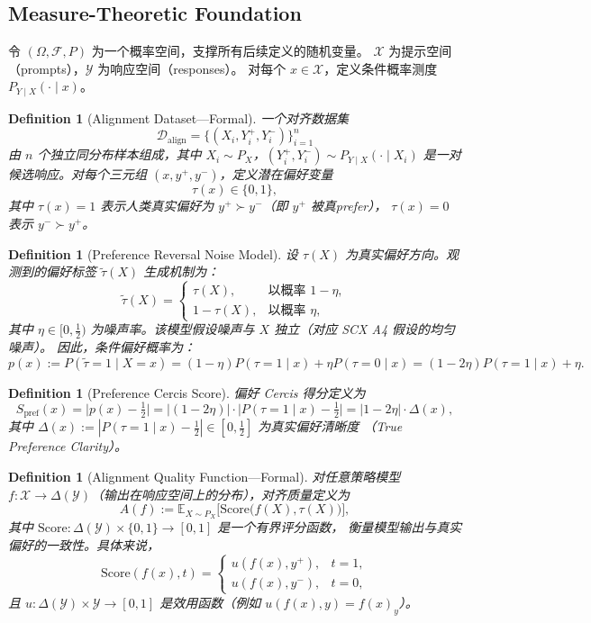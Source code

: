 \documentclass[12pt,a4paper]{article}
\newtheorem{definition}[theorem]{Definition}
\newcommand{\E}{\mathbb{E}}
\newcommand{\cX}{\mathcal{X}}
\newcommand{\cY}{\mathcal{Y}}
\newcommand{\cD}{\mathcal{D}}
\begin{document}
\subsection{Measure-Theoretic Foundation}

令 $(\Omega, \mathcal{F}, P)$ 为一个概率空间，支撑所有后续定义的随机变量。
$\cX$ 为提示空间（prompts），$\cY$ 为响应空间（responses）。
对每个 $x\in\cX$，定义条件概率测度 $P_{Y\mid X}(\cdot\mid x)$。

\begin{definition}[Alignment Dataset---Formal]
\label{def:align-data-formal}
一个对齐数据集
\[
\cD_{\mathrm{align}} = \{(X_i, Y_i^+, Y_i^-)\}_{i=1}^n
\]
由 $n$ 个独立同分布样本组成，其中 $X_i \sim P_X$，$(Y_i^+,Y_i^-)\sim P_{Y\mid X}(\cdot\mid X_i)$
是一对候选响应。对每个三元组 $(x,y^+,y^-)$，定义潜在偏好变量
\[
\tau(x) \in \{0,1\},
\]
其中 $\tau(x)=1$ 表示人类真实偏好为 $y^+ \succ y^-$（即 $y^+$ 被真prefer），
$\tau(x)=0$ 表示 $y^- \succ y^+$。
\end{definition}

\begin{definition}[Preference Reversal Noise Model]
\label{def:pref-noise-formal}
设 $\tau(X)$ 为真实偏好方向。观测到的偏好标签 $\tilde{\tau}(X)$ 生成机制为：
\[
\tilde{\tau}(X) =
\begin{cases}
\tau(X), & \text{以概率 } 1-\eta,\\
1-\tau(X), & \text{以概率 } \eta,
\end{cases}
\]
其中 $\eta\in[0,\frac12)$ 为噪声率。该模型假设噪声与 $X$ 独立（对应 SCX A4 假设的均匀噪声）。
因此，条件偏好概率为：
\[
p(x) := P(\tilde{\tau}=1 \mid X=x) = (1-\eta)P(\tau=1\mid x) + \eta P(\tau=0\mid x)
= (1-2\eta)P(\tau=1\mid x) + \eta.
\]
\end{definition}

\begin{definition}[Preference Cercis Score]
\label{def:S-pref-formal}
偏好 Cercis 得分定义为
\[
S_{\mathrm{pref}}(x) = \bigl|p(x) - \tfrac12\bigr|
= \bigl|(1-2\eta)\bigr|\cdot\bigl|P(\tau=1\mid x) - \tfrac12\bigr|
= |1-2\eta|\cdot \Delta(x),
\]
其中 $\Delta(x) := |P(\tau=1\mid x) - \frac12| \in [0,\frac12]$ 为真实偏好清晰度
（True Preference Clarity）。
\end{definition}

\begin{definition}[Alignment Quality Function---Formal]
\label{def:align-quality-formal}
对任意策略模型 $f:\cX\to\Delta(\cY)$（输出在响应空间上的分布），对齐质量定义为
\[
A(f) := \E_{X\sim P_X}\bigl[ \mathrm{Score}\bigl(f(X), \tau(X)\bigr) \bigr],
\]
其中 $\mathrm{Score}:\Delta(\cY)\times\{0,1\}\to[0,1]$ 是一个有界评分函数，
衡量模型输出与真实偏好的一致性。具体来说，
\[
\mathrm{Score}(f(x), t) =
\begin{cases}
u(f(x), y^+), & t=1,\\
u(f(x), y^-), & t=0,
\end{cases}
\]
且 $u:\Delta(\cY)\times\cY\to[0,1]$ 是效用函数（例如 $u(f(x),y)=f(x)_y$）。
\end{definition}
\end{document}

